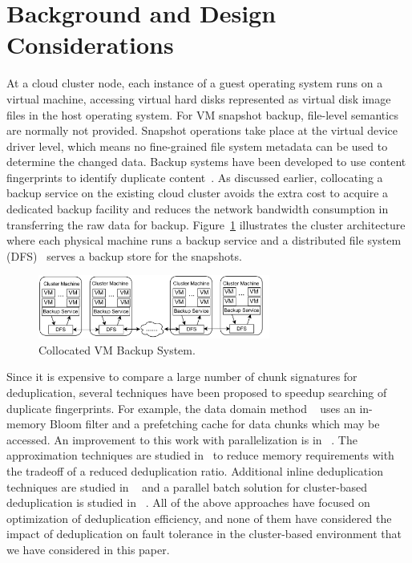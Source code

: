 \section{Background and Design Considerations}
\label{sect:background}
At a cloud cluster node, each instance of a guest operating system runs on a virtual machine, accessing virtual hard disks 
represented as virtual disk image files in the host operating system.
For VM snapshot backup, file-level semantics are normally not provided.
Snapshot operations take place at the virtual device driver level, which
means no fine-grained file system metadata can be used to determine the changed data. 
Backup systems have been developed to use content fingerprints to identify duplicate
content~\cite{venti02,Rhea2008}.  
As discussed earlier, collocating a backup service on the existing
cloud cluster avoids the extra cost to acquire a dedicated backup facility
and reduces the network bandwidth consumption in transferring the
raw data for backup. 
Figure~\ref{fig:collocated} illustrates the cluster architecture where
each physical machine runs a backup service and a distributed file system (DFS)~\cite{googlefs03,hdfs10} 
serves a backup store  for the snapshots.

\begin{figure}[htb]
    \centering
    \includegraphics[width=3in]{images/colocated-arch}
    \caption{Collocated VM Backup System.}
    \label{fig:collocated}
\end{figure}

Since it is expensive to compare a large number of chunk signatures for deduplication,
several techniques have been proposed to speedup searching of duplicate
fingerprints. For example, the data domain method ~\cite{bottleneck08} 
uses  an in-memory Bloom filter and a prefetching cache for data chunks  which may be
accessed.  An improvement to this work with parallelization is in ~\cite{MAD210,DEBAR}.
The approximation techniques are studied in~\cite{extreme_binning09,Guo2011,WeiZhangIEEE}  
to reduce memory requirements with the tradeoff of a reduced deduplication ratio.
Additional inline deduplication techniques are studied in ~\cite{sparseindex09,Guo2011,Srinivasan2012}
and a parallel batch solution for cluster-based deduplication is 
studied in ~\cite{wei2013}. 
All of the above approaches have focused on optimization of deduplication
efficiency, and none of them have considered the impact
of deduplication on fault tolerance in the cluster-based environment that we have considered
in this paper.

